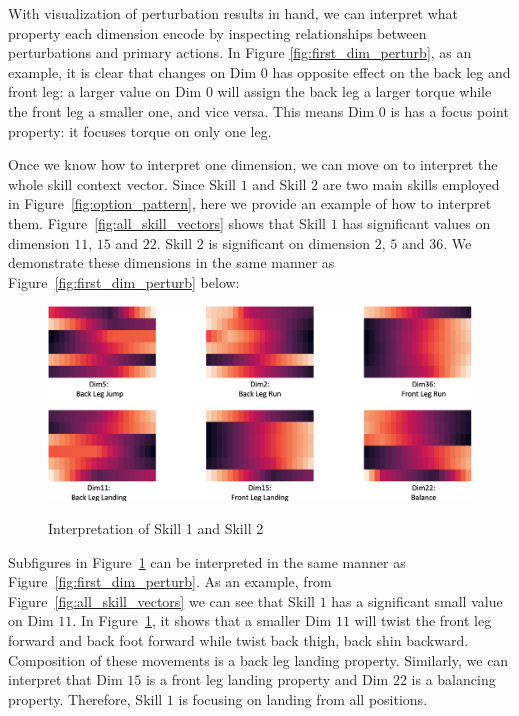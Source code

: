 With visualization of perturbation results in hand, we can
interpret what property each dimension encode by inspecting
relationships between perturbations and primary actions. In
Figure \ref{fig:first_dim_perturb}, as an example, it is clear
that changes on Dim $0$ has opposite effect on the back leg and
front leg: a larger value on Dim $0$ will assign the back leg a
larger torque while the front leg a smaller one, and vice versa.
This means Dim $0$ is has a focus point property: it focuses
torque on only one leg.

Once we know how to interpret one dimension, we can move on to
interpret the whole skill context vector. Since Skill $1$ and
Skill $2$ are two main skills employed in
Figure~\ref{fig:option_pattern}, here we provide an example of
how to interpret them. Figure~\ref{fig:all_skill_vectors} shows
that Skill $1$ has significant values on dimension $11$, $15$ and
$22$. Skill $2$ is significant on dimension $2$, $5$ and $36$. We
demonstrate these dimensions in the same manner as
Figure~\ref{fig:first_dim_perturb} below:
\begin{figure}[h]
  \centering
  \includegraphics[width=1\linewidth]{./Part1/figures/interp_2_skills.png}\\
  \caption{\label{fig:interp_skill} Interpretation of Skill 1
    and Skill 2}
\end{figure}

Subfigures in Figure~\ref{fig:interp_skill} can be interpreted in
the same manner as Figure~\ref{fig:first_dim_perturb}. As an
example, from Figure~\ref{fig:all_skill_vectors} we can see that
Skill $1$ has a significant small value on Dim $11$. In
Figure~\ref{fig:interp_skill}, it shows that a smaller Dim $11$
will twist the front leg forward and back foot forward while
twist back thigh, back shin backward. Composition of these
movements is a back leg landing property. Similarly, we can
interpret that Dim $15$ is a front leg landing property and Dim
$22$ is a balancing property. Therefore, Skill $1$ is focusing on
landing from all positions.

